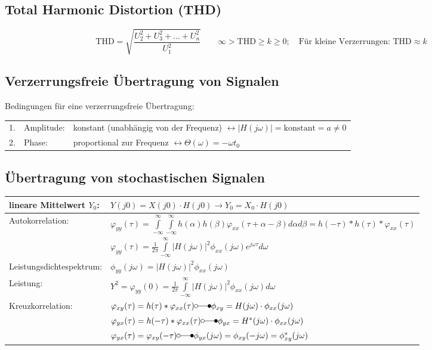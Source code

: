 \subsection{Total Harmonic Distortion (THD) }
$$\text{THD} = \sqrt{ \frac {U_2^2+ U_3^2 + \ldots + U_n^2} {U_1^2} } \qquad
\infty > \text{THD} \geq k \geq 0; \quad \text{Für kleine Verzerrungen: THD}
\approx k $$

\subsection{Verzerrungsfreie Übertragung von Signalen }
	Bedingungen für eine verzerrungsfreie Übertragung:\\
	\begin{tabular}{lll}
		1. & Amplitude: & konstant (unabhängig von der Frequenz) $\leftrightarrow
			|H(j\omega)| = \text{konstant} = a \neq 0$ \\
		2. & Phase: & proportional zur Frequenz $\leftrightarrow
			\Theta(\omega) = -\omega t_0$ 
	\end{tabular}
	
\subsection{Übertragung von stochastischen Signalen }
\begin{tabular}{|l|l|}
	\hline
		lineare Mittelwert $Y_0$: &
		$Y(j0) = X(j0) \cdot H(j0) \rightarrow Y_0 = X_0 \cdot H(j0)$ \\
	\hline
		Autokorrelation: &
		$\varphi_{yy}(\tau) = \int\limits_{-\infty}^{\infty} \int\limits_{-\infty}^{\infty}
		h(\alpha)h(\beta)\varphi_{xx}(\tau+\alpha-\beta)d\alpha d\beta = h(-\tau) * h(\tau) * \varphi_{xx}(\tau)$\\
		& $\varphi_{yy}(\tau) = \frac{1}{2\pi} \int\limits_{-\infty}^{\infty}|H(j\omega)|^2 \phi_{xx}(j\omega)
		e^{j\omega \tau} d\omega$ \\
	\hline
		Leistungsdichtespektrum: &
		$\phi_{yy}(j\omega) = |H(j\omega)|^2\phi_{xx}(j\omega)$\\
	\hline
		Leistung: &
		$Y^2 = \varphi_{yy}(0) = \frac{1}{2\pi}\int\limits_{-\infty}^{\infty}|H(j\omega)|^2\phi_{xx}(j\omega) d\omega$\\
	\hline
		Kreuzkorrelation: &
		$\varphi_{xy}(\tau) = h(\tau) * \varphi_{xx}(\tau) \laplace \phi_{xy} = H(j\omega) \cdot \phi_{xx}(j\omega)$ \\
		& $\varphi_{yx}(\tau) = h(-\tau) * \varphi_{xx}(\tau) \laplace \phi_{yx} = H^*(j\omega) \cdot \phi_{xx}(j\omega)$ \\
		& $\varphi_{yx}(\tau) = \varphi_{xy}(-\tau) \laplace \phi_{yx}(j\omega) = \phi_{xy}(-j\omega) = \phi_{xy}^*(j\omega)$\\
	\hline
\end{tabular}